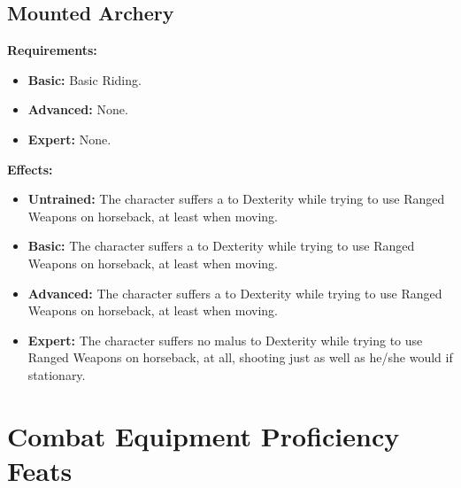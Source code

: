 \documentclass[openany,10pt,a4paper]{book}
\begin{document}
\subsection{Mounted Archery}
\textbf{Requirements:}
\begin{itemize}
	\item \textbf{Basic:} Basic Riding.
	\item \textbf{Advanced:} None.
	\item \textbf{Expert:} None.
\end{itemize}
\textbf{Effects:}
\begin{itemize}
	\item \textbf{Untrained:} The character suffers a  to Dexterity while trying to use Ranged Weapons on horseback, at least when moving.
	\item \textbf{Basic:} The character suffers a  to Dexterity while trying to use Ranged Weapons on horseback, at least when moving.
	\item \textbf{Advanced:} The character suffers a  to Dexterity while trying to use Ranged Weapons on horseback, at least when moving.
	\item \textbf{Expert:} The character suffers no malus to Dexterity while trying to use Ranged Weapons on horseback, at all, shooting just as well as he/she would if stationary.
\end{itemize}\newpage
\section{Combat Equipment Proficiency Feats}
\end{document}
